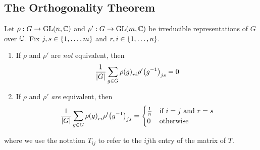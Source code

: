 \subsection{The Orthogonality Theorem}

\begin{lemma}
    Let $\rho : G \to \operatorname{GL}\!\left( n, \mathbb{C} \right)$ and $\rho' : G \to \operatorname{GL}\!\left( m, \mathbb{C} \right)$ be irreducible representations of $G$ over $\mathbb{C}$. Fix $j, s \in \left\{ 1, \ldots, m \right\}$ and $r, i \in \left\{ 1, \ldots, n \right\}$.
    \begin{enumerate}[label = \normalfont \arabic*., noitemsep]
        \item If $\rho$ and $\rho'$ are \textit{not} equivalent, then
        \begin{align*}
            \frac{1}{\left\lvert G \right\rvert} \sum_{g \in G} {\rho(g)}_{ri} {\rho'\!\left( g^{-1} \right)}_{js} = 0
        \end{align*}

        \item If $\rho$ and $\rho'$ \textit{are} equivalent, then
        \begin{align*}
            \frac{1}{\left\lvert G \right\rvert} \sum_{g \in G} {\rho(g)}_{ri} {\rho'\!\left( g^{-1} \right)}_{js} =
            \begin{cases}
                \frac{1}{n} & \text{if } i = j \text{ and } r = s \\
                0 & \text{otherwise}
            \end{cases}
        \end{align*}
    \end{enumerate}
    where we use the notation $T_{ij}$ to refer to the $ij$th entry of the matrix of $T$.
\end{lemma}
